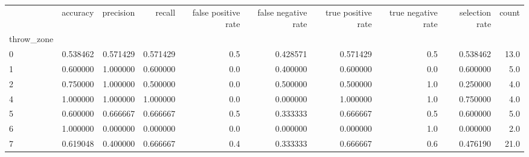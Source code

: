 \begin{tabular}{lrrrrrrrrr}
\toprule
{} &  accuracy &  precision &    recall &  false positive rate &  false negative rate &  true positive rate &  true negative rate &  selection rate &  count \\
throw\_zone &           &            &           &                      &                      &                     &                     &                 &        \\
\midrule
0          &  0.538462 &   0.571429 &  0.571429 &                  0.5 &             0.428571 &            0.571429 &                 0.5 &        0.538462 &   13.0 \\
1          &  0.600000 &   1.000000 &  0.600000 &                  0.0 &             0.400000 &            0.600000 &                 0.0 &        0.600000 &    5.0 \\
2          &  0.750000 &   1.000000 &  0.500000 &                  0.0 &             0.500000 &            0.500000 &                 1.0 &        0.250000 &    4.0 \\
4          &  1.000000 &   1.000000 &  1.000000 &                  0.0 &             0.000000 &            1.000000 &                 1.0 &        0.750000 &    4.0 \\
5          &  0.600000 &   0.666667 &  0.666667 &                  0.5 &             0.333333 &            0.666667 &                 0.5 &        0.600000 &    5.0 \\
6          &  1.000000 &   0.000000 &  0.000000 &                  0.0 &             0.000000 &            0.000000 &                 1.0 &        0.000000 &    2.0 \\
7          &  0.619048 &   0.400000 &  0.666667 &                  0.4 &             0.333333 &            0.666667 &                 0.6 &        0.476190 &   21.0 \\
\bottomrule
\end{tabular}
